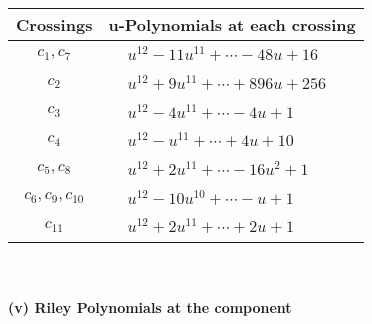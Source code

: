 \documentclass[1p]{elsarticle_modified}
\theoremstyle{definition}
\begin{document}
\begin{tabular}{m{50pt}|m{274pt}}
Crossings & \hspace{64pt}u-Polynomials at each crossing \\
\hline $$\begin{aligned}c_{1},c_{7}\end{aligned}$$&$\begin{aligned}
&u^{12}-11 u^{11}+\cdots-48 u+16
\end{aligned}$\\
\hline $$\begin{aligned}c_{2}\end{aligned}$$&$\begin{aligned}
&u^{12}+9 u^{11}+\cdots+896 u+256
\end{aligned}$\\
\hline $$\begin{aligned}c_{3}\end{aligned}$$&$\begin{aligned}
&u^{12}-4 u^{11}+\cdots-4 u+1
\end{aligned}$\\
\hline $$\begin{aligned}c_{4}\end{aligned}$$&$\begin{aligned}
&u^{12}- u^{11}+\cdots+4 u+10
\end{aligned}$\\
\hline $$\begin{aligned}c_{5},c_{8}\end{aligned}$$&$\begin{aligned}
&u^{12}+2 u^{11}+\cdots-16 u^2+1
\end{aligned}$\\
\hline $$\begin{aligned}c_{6},c_{9},c_{10}\end{aligned}$$&$\begin{aligned}
&u^{12}-10 u^{10}+\cdots- u+1
\end{aligned}$\\
\hline $$\begin{aligned}c_{11}\end{aligned}$$&$\begin{aligned}
&u^{12}+2 u^{11}+\cdots+2 u+1
\end{aligned}$\\
\hline
\end{tabular}\\~\\
\newpage\renewcommand{\arraystretch}{1}
\flushleft \textbf{(v) Riley Polynomials at the component}\newline \\
\end{document}
